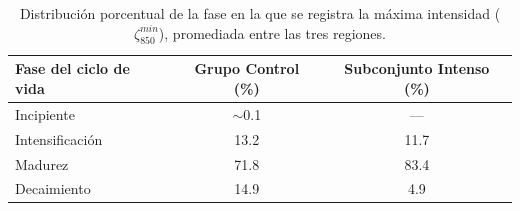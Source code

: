 \begin{table}[ht]
\centering
\caption{Distribución porcentual de la fase en la que se registra la máxima intensidad ($\zeta_{850}^{min}$), promediada entre las tres regiones.}
\label{tab:fase_max_intensidad}
\begin{tabular}{l c c}
\hline
\textbf{Fase del ciclo de vida} & \textbf{Grupo Control (\%)} & \textbf{Subconjunto Intenso (\%)} \\ \hline
Incipiente       & $\sim$0.1 & ---  \\
Intensificación  & 13.2      & 11.7 \\
Madurez          & 71.8      & 83.4 \\
Decaimiento      & 14.9      & 4.9  \\ \hline
\end{tabular}
\end{table}